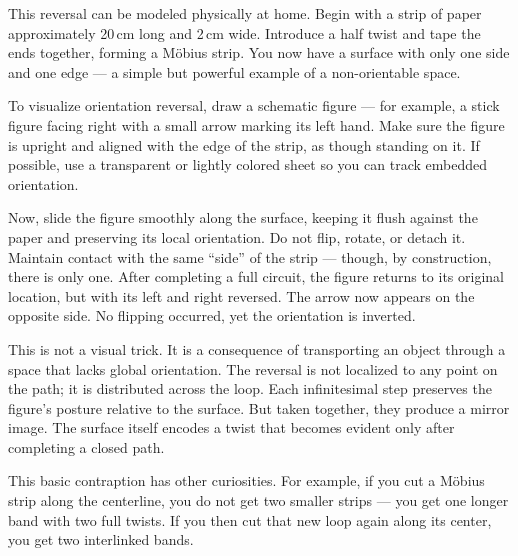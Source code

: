 \begin{commentary}
This reversal can be modeled physically at home. Begin with a strip of paper approximately 20 cm long and 2 cm wide. Introduce a half twist and tape the ends together, forming a Möbius strip. You now have a surface with only one side and one edge — a simple but powerful example of a non-orientable space.

To visualize orientation reversal, draw a schematic figure — for example, a stick figure facing right with a small arrow marking its left hand. Make sure the figure is upright and aligned with the edge of the strip, as though standing on it. If possible, use a transparent or lightly colored sheet so you can track embedded orientation.

Now, slide the figure smoothly along the surface, keeping it flush against the paper and preserving its local orientation. Do not flip, rotate, or detach it. Maintain contact with the same “side” of the strip — though, by construction, there is only one. After completing a full circuit, the figure returns to its original location, but with its left and right reversed. The arrow now appears on the opposite side. No flipping occurred, yet the orientation is inverted.

This is not a visual trick. It is a consequence of transporting an object through a space that lacks global orientation. The reversal is not localized to any point on the path; it is distributed across the loop. Each infinitesimal step preserves the figure’s posture relative to the surface. But taken together, they produce a mirror image. The surface itself encodes a twist that becomes evident only after completing a closed path.

This basic contraption has other curiosities. For example, if you cut a Möbius strip along the centerline, you do not get two smaller strips — you get one longer band with two full twists. If you then cut that new loop again along its center, you get two interlinked bands.

\end{commentary}

